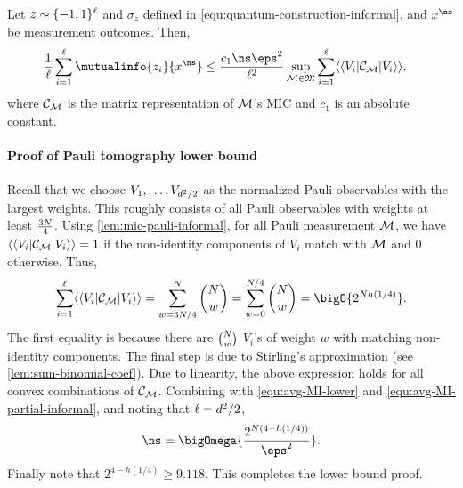 \begin{theorem}
\label{thm:avg-MI-upper-informal}
    Let ${z}\sim\{-1,1\}^{\ell}$ and $\sigma_z$ defined in \eqref{equ:quantum-construction-informal}, and $\out^\ns$ be measurement outcomes. Then,
    \begin{align}
         \frac{1}{\ell}\sum_{i=1}^{\ell}\mutualinfo{\ptb_i}{\out^\ns}&\le  \frac{c_1\ns\eps^2}{\ell^2} \sup_{\POVM\in {\povmset}}\sum_{i=1}^{\ell} \vadj{V_i} \Choi_{\POVM} \vvec{V_i}\label{equ:avg-MI-partial-informal},
    \end{align}
    where ${\mathcal{C}}_{\mathcal{M}}$ is the matrix representation of  $\mathcal{M}$'s MIC and $c_1$ is an absolute constant.
\end{theorem}

\paragraph{Proof of Pauli tomography lower bound} Recall that we choose $V_1, \ldots, V_{d^2/2}$ as the normalized Pauli observables with the largest weights. This roughly consists of all Pauli observables with weights at least $\frac{3{N}}{4}$. Using \cref{lem:mic-pauli-informal},  for all Pauli measurement $\mathcal{M}$, we have $\langle\langle V_i| {\mathcal{C}}_{\mathcal{M}} |V_i\rangle\rangle=1$ if the non-identity components of $V_i$ match with $\mathcal{M}$ and 0 otherwise. Thus,
\[
\sum_{i=1}^{\ell} \vadj{V_i} \Choi_{\POVM} \vvec{V_i}=\sum_{w=3\nqubits/4}^{\nqubits}{\nqubits\choose w}=\sum_{w=0}^{\nqubits/4}{\nqubits\choose w}= \bigO{2^{\nqubits h(1/4)}}.
\]
The first equality is because there are ${{N}\choose w}$  $V_i$'s of weight $w$ with matching non-identity components. 
The final step is due to Stirling's approximation (see \cref{lem:sum-binomial-coef}). 
Due to linearity, the above expression holds for all convex combinations of ${\mathcal{C}}_{\mathcal{M}}$. Combining with \eqref{equ:avg-MI-lower} and \eqref{equ:avg-MI-partial-informal}, and noting that $\ell=d^2/2$,
\[
\ns =\bigOmega{\frac{2^{\nqubits(4-h(1/4))}}{\eps^2}}.
\]
Finally note that $2^{4-h(1/4)}\ge 9.118$. This completes the lower bound proof.

